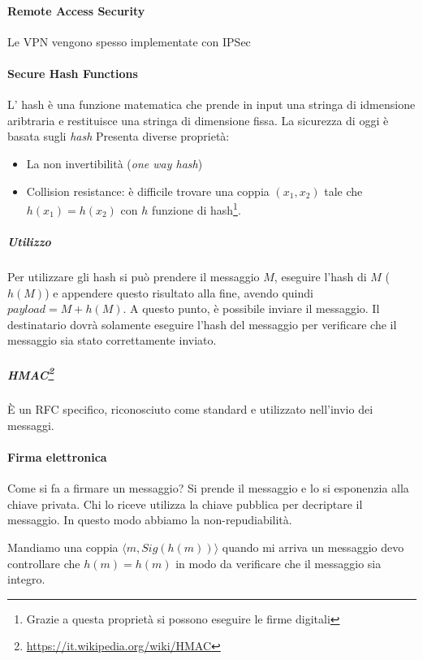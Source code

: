 \paragraph{Remote Access Security}

Le VPN vengono spesso implementate con IPSec 

\paragraph{Secure Hash Functions}

L' hash è una funzione matematica che prende in input una stringa di idmensione
aribtraria e restituisce una stringa di dimensione fissa. La sicurezza di oggi è
basata sugli \textit{hash} Presenta diverse proprietà:
\begin{itemize}
\item La non invertibilità (\emph{one way hash})
\item Collision resistance: è difficile trovare una coppia $(x_1,x_2)$ tale che
$h(x_1) = h(x_2)$ con $h$ funzione di hash\footnote{Grazie a questa proprietà si
possono eseguire le firme digitali}.
\end{itemize}

\subparagraph*{Utilizzo}

Per utilizzare gli hash si può prendere il messaggio $M$, eseguire l'hash di $M$
($h(M)$) e appendere questo risultato alla fine, avendo quindi $payload = M +
h(M)$. A questo punto, è possibile inviare il messaggio. Il destinatario dovrà
solamente eseguire l'hash del messaggio per verificare che il messaggio sia
stato correttamente inviato.

\subparagraph*{HMAC\footnote{\url{https://it.wikipedia.org/wiki/HMAC}}}

È un RFC specifico, riconosciuto come standard e utilizzato nell'invio dei
messaggi.


\paragraph{Firma elettronica}

Come si fa a firmare un messaggio? Si prende il messaggio e lo si esponenzia
alla chiave privata. Chi lo riceve utilizza la chiave pubblica per decriptare il
messaggio. In questo modo abbiamo la non-repudiabilità.

Mandiamo una coppia $ \langle m, Sig(h(m)) \rangle $ quando mi arriva un
messaggio devo controllare che
$h(m) = h(m)$ in modo da verificare che il messaggio sia integro.
